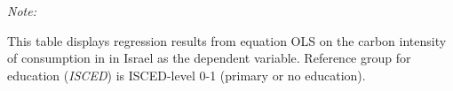 \begin{table}[htbp!]
\begin{adjustbox}{width = 1\textwidth, max height = 0.95\textheight, center}
\begin{threeparttable}[b]
         \begin{tablenotes}\item \medskip \textit{Note:}
            \item This table displays regression results from equation OLS on the carbon intensity of consumption in  in Israel as the dependent variable. Reference group for education (\textit{ISCED}) is ISCED-level 0-1 (primary or no education).
         \end{tablenotes}
      \end{threeparttable}
   \end{adjustbox}
\end{table}


